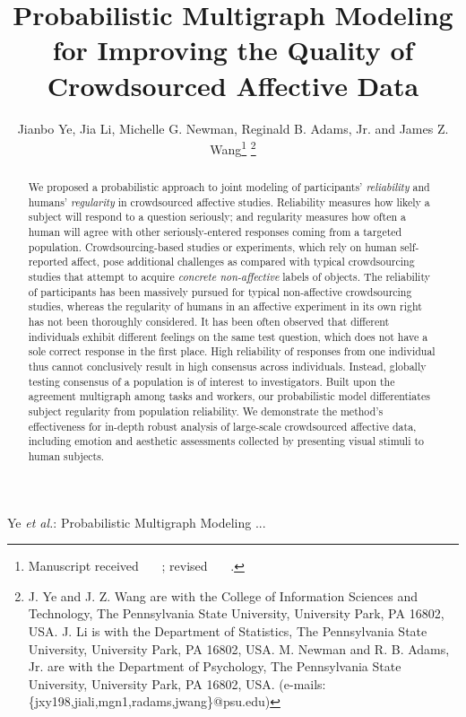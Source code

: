 \documentclass[10pt,journal,letterpaper,compsoc,twoside]{IEEEtran}
\begin{document}
\title{Probabilistic Multigraph Modeling for Improving\break 
the Quality of Crowdsourced Affective Data}
\author{Jianbo Ye, Jia Li, Michelle G. Newman, Reginald B. Adams, Jr. and James Z. Wang\thanks{Manuscript received \ \ \ ; revised \ \ \ .}
\thanks{J. Ye and J. Z. Wang are with the College of Information Sciences and Technology, The Pennsylvania State University, University Park, PA 16802, USA. J. Li is with the Department of Statistics, The Pennsylvania State University, University Park, PA 16802, USA. M. Newman and R. B. Adams, Jr. are with the Department of Psychology, The Pennsylvania State University, University Park, PA 16802, USA.
(e-mails: \{jxy198,jiali,mgn1,radams,jwang\}@psu.edu)}
}

{Ye \MakeLowercase{\textit{et al.}}: Probabilistic Multigraph Modeling ...}

\maketitle

\begin{abstract}
We proposed a probabilistic approach to joint modeling of
participants' \textit{reliability} and humans' \textit{regularity}
in crowdsourced affective studies. 
{Reliability} measures how likely 
a subject will respond to a question {seriously};
and {regularity} measures how often 
a human will agree with other seriously-entered responses coming from a 
targeted population. Crowdsourcing-based studies or experiments,  
which rely on human self-reported affect, pose additional challenges
as compared with 
typical crowdsourcing studies that attempt to acquire {\it concrete non-affective} labels of objects. 
The reliability of participants has been 
massively pursued for typical non-affective crowdsourcing studies, 
whereas the regularity of humans in an affective experiment 
in its own right has not been thoroughly considered.  
It has been often observed that different individuals exhibit different feelings on 
the same test question, which does not have a sole correct response in the first place.
High reliability of responses from one individual thus cannot conclusively result in
high consensus across individuals. Instead, globally testing consensus
of a population is of interest to investigators.
Built upon the agreement multigraph among tasks and workers, our probabilistic model differentiates 
subject regularity from population reliability. 
We demonstrate the method's effectiveness for in-depth robust analysis of 
large-scale crowdsourced affective data, including emotion and aesthetic assessments collected 
by presenting visual stimuli to human subjects. 
\end{abstract}
\end{document}
